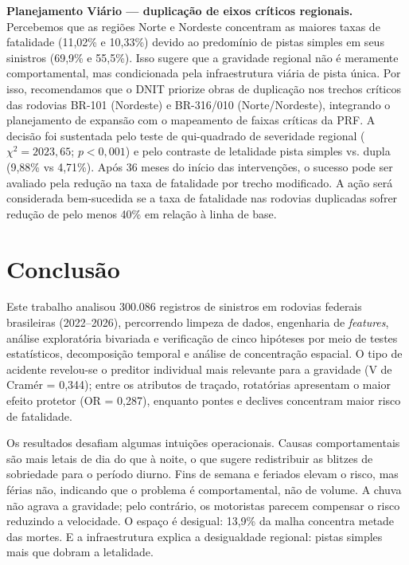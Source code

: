 \documentclass[12pt]{article}
\begin{document}
\textbf{Planejamento Viário — duplicação de eixos críticos regionais.}
Percebemos que as regiões Norte e Nordeste concentram as maiores taxas de fatalidade (11,02\% e 10,33\%) devido ao predomínio de pistas simples em seus sinistros (69,9\% e 55,5\%). Isso sugere que a gravidade regional não é meramente comportamental, mas condicionada pela infraestrutura viária de pista única. Por isso, recomendamos que o DNIT priorize obras de duplicação nos trechos críticos das rodovias BR-101 (Nordeste) e BR-316/010 (Norte/Nordeste), integrando o planejamento de expansão com o mapeamento de faixas críticas da PRF. A decisão foi sustentada pelo teste de qui-quadrado de severidade regional ($\chi^2 = 2023,65$; $p < 0,001$) e pelo contraste de letalidade pista simples vs. dupla (9,88\% vs 4,71\%). Após 36 meses do início das intervenções, o sucesso pode ser avaliado pela redução na taxa de fatalidade por trecho modificado. A ação será considerada bem-sucedida se a taxa de fatalidade nas rodovias duplicadas sofrer redução de pelo menos 40\% em relação à linha de base.


\section{Conclusão}

Este trabalho analisou 300.086 registros de sinistros em rodovias
federais brasileiras (2022--2026), percorrendo limpeza de dados,
engenharia de \textit{features}, análise exploratória bivariada e
verificação de cinco hipóteses por meio de testes estatísticos,
decomposição temporal e análise de concentração espacial. O tipo de
acidente revelou-se o preditor individual mais relevante para a
gravidade (V de Cramér = 0{,}344); entre os atributos de traçado,
rotatórias apresentam o maior efeito protetor (OR = 0{,}287), enquanto
pontes e declives concentram maior risco de fatalidade.

Os resultados desafiam algumas intuições operacionais. Causas
comportamentais são mais letais de dia do que à noite, o que sugere
redistribuir as blitzes de sobriedade para o período diurno. Fins de
semana e feriados elevam o risco, mas férias não, indicando que o
problema é comportamental, não de volume. A chuva não agrava a
gravidade; pelo contrário, os motoristas parecem compensar o risco
reduzindo a velocidade. O espaço é desigual: 13,9\% da malha
concentra metade das mortes. E a infraestrutura explica a desigualdade
regional: pistas simples mais que dobram a letalidade.
\end{document}
